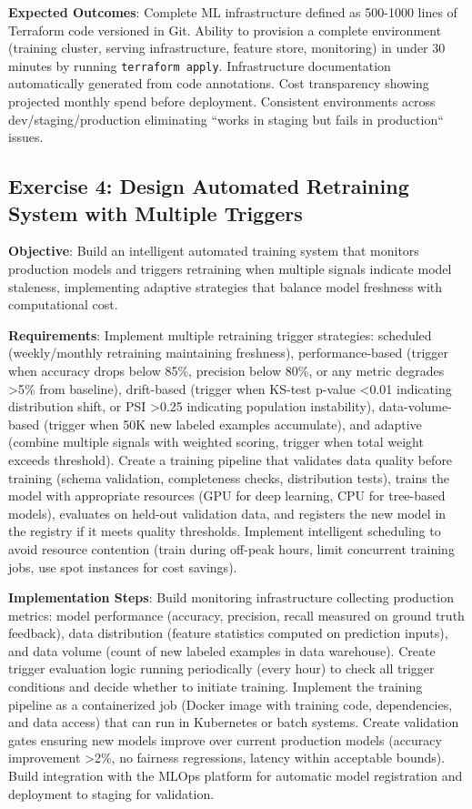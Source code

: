 \textbf{Expected Outcomes}: Complete ML infrastructure defined as 500-1000 lines of Terraform code versioned in Git. Ability to provision a complete environment (training cluster, serving infrastructure, feature store, monitoring) in under 30 minutes by running \texttt{terraform apply}. Infrastructure documentation automatically generated from code annotations. Cost transparency showing projected monthly spend before deployment. Consistent environments across dev/staging/production eliminating ``works in staging but fails in production`` issues.

\subsection{Exercise 4: Design Automated Retraining System with Multiple Triggers}

\textbf{Objective}: Build an intelligent automated training system that monitors production models and triggers retraining when multiple signals indicate model staleness, implementing adaptive strategies that balance model freshness with computational cost.

\textbf{Requirements}: Implement multiple retraining trigger strategies: scheduled (weekly/monthly retraining maintaining freshness), performance-based (trigger when accuracy drops below 85\%, precision below 80\%, or any metric degrades >5\% from baseline), drift-based (trigger when KS-test p-value <0.01 indicating distribution shift, or PSI >0.25 indicating population instability), data-volume-based (trigger when 50K new labeled examples accumulate), and adaptive (combine multiple signals with weighted scoring, trigger when total weight exceeds threshold). Create a training pipeline that validates data quality before training (schema validation, completeness checks, distribution tests), trains the model with appropriate resources (GPU for deep learning, CPU for tree-based models), evaluates on held-out validation data, and registers the new model in the registry if it meets quality thresholds. Implement intelligent scheduling to avoid resource contention (train during off-peak hours, limit concurrent training jobs, use spot instances for cost savings).

\textbf{Implementation Steps}: Build monitoring infrastructure collecting production metrics: model performance (accuracy, precision, recall measured on ground truth feedback), data distribution (feature statistics computed on prediction inputs), and data volume (count of new labeled examples in data warehouse). Create trigger evaluation logic running periodically (every hour) to check all trigger conditions and decide whether to initiate training. Implement the training pipeline as a containerized job (Docker image with training code, dependencies, and data access) that can run in Kubernetes or batch systems. Create validation gates ensuring new models improve over current production models (accuracy improvement >2\%, no fairness regressions, latency within acceptable bounds). Build integration with the MLOps platform for automatic model registration and deployment to staging for validation.

